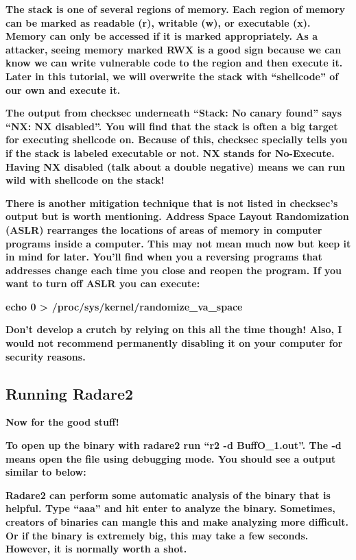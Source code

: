 \documentclass[letterpaper]{article}
\newcommand{\sitfig}[3]{
\begin{figure}[H]
\centering
\makebox[\textwidth][c]{
#2
}
\label{#1}
\end{figure}
}
\newcommand{\sitgfx}[4][scale=1.0]{
\sitfig{#3}{\texttt{[image: \#2]}}{#4}
}
\begin{document}
\textbf{The stack is one of several regions of memory. Each region of memory can be marked as readable (r), writable
(w), or executable (x). Memory can only be accessed if it is marked appropriately. As a attacker, seeing memory marked
RWX is a good sign because we can know we can write vulnerable code to the region and then execute it. Later in this
tutorial, we will overwrite the stack with ``shellcode'' of our own and execute it.}

\textbf{The output from checksec underneath ``Stack: No canary found'' says ``NX: NX disabled''. You will find that the
stack is often a big target for executing shellcode on. Because of this, checksec specially tells you if the stack is
labeled executable or not. NX stands for No-Execute. Having NX disabled (talk about a double negative) means we can run
wild with shellcode on the stack!}

\textbf{There is another mitigation technique that is not listed in checksec's output but is worth mentioning. Address
Space Layout Randomization (ASLR) rearranges the locations of areas of memory in computer programs inside a computer.
This may not mean much now but keep it in mind for later. You'll find when you a reversing programs that addresses
change each time you close and reopen the program. If you want to turn off ASLR you can execute:}

\textbf{echo 0 {\textgreater} /proc/sys/kernel/randomize\_va\_space}

\textbf{Don't develop a crutch by relying on this all the time though! Also, I would not recommend permanently disabling
it on your computer for security reasons.}

\subsection{Running Radare2}

\textbf{Now for the good stuff!}

\textbf{To open up the binary with radare2 run ``r2 -d BuffO\_1.out''. The -d means open the file using debugging mode.
You should see a output similar to below:}

  
\sitgfx[width=5.8335in,height=3.6457in]{FINALWORKINGDOCFORMERLYPRECURSOR-img084.png}{fig:unk}{TODO CAPTION}
 

\textbf{Radare2 can perform some automatic analysis of the binary that is helpful. Type ``aaa'' and hit enter to analyze
the binary. Sometimes, creators of binaries can mangle this and make analyzing more difficult. Or if the binary is
extremely big, this may take a few seconds. However, it is normally worth a shot.}
\end{document}
